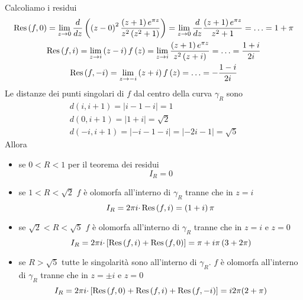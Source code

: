 \begin{figure}[htpb]
\end{figure}
\FloatBarrier

Calcoliamo i residui
\begin{gather*}
\operatorname{Res} \left( f,0\right) =\lim _{z\rightarrow 0}\frac{d}{dz}\left(\left( z-0\right)^{2}\frac{\left( z+1\right) e^{\pi z}}{z^{2}\left( z^{2} +1\right)}\right) =\lim _{z\rightarrow 0}\frac{d}{dz}\frac{\left( z+1\right) e^{\pi z}}{z^{2} +1} =\dotsc =1+\pi \\
\operatorname{Res} \left( f,i\right) =\lim _{z\rightarrow i}\left( z-i\right) f\left( z\right) =\lim _{z\rightarrow i}\frac{\left( z+1\right) e^{\pi z}}{z^{2}\left( z+i\right)} =\dotsc =\frac{1+i}{2i}\\
\operatorname{Res} \left( f,-i\right) =\lim _{z\rightarrow -i}\left( z+i\right) f\left( z\right) =\dotsc =-\frac{1-i}{2i}
\end{gather*}
Le distanze dei punti singolari di $f$ dal centro della curva $\gamma _{R}$ sono
\begin{gather*}
d\left( i,i+1\right) =\left| i-1-i\right| =1\\
d\left( 0,i+1\right) =\left| 1+i\right| =\sqrt{2}\\
d\left( -i,i+1\right) =\left| -i-1-i\right| =\left| -2i-1\right| =\sqrt{5}
\end{gather*}
Allora
\begin{itemize}
\item se $0< R< 1$ per il teorema dei residui\begin{equation*}
I_{R} =0
\end{equation*}
\item se $1< R< \sqrt{2}$ $f$ è olomorfa all'interno di $\gamma _{R}$ tranne che in $z=i$\begin{equation*}
I_{R} =2\pi i\cdotp \operatorname{Res} \left( f,i\right) =\left( 1+i\right) \pi 
\end{equation*}
\item se $\sqrt{2} < R< \sqrt{5}$ $f$ è olomorfa all'interno di $\gamma _{R}$ tranne che in $z=i$ e $z=0$\begin{equation*}
I_{R} =2\pi i\cdotp \left[\operatorname{Res} \left( f,i\right) +\operatorname{Res} \left( f,0\right)\right] =\pi +i\pi \left( 3 +2\pi\right)
\end{equation*}
\item se $R> \sqrt{5}$ tutte le singolarità sono all'interno di $\gamma _{R}$. $f$ è olomorfa all'interno di $\gamma _{R}$ tranne che in $z=\pm i$ e $z=0$\begin{equation*}
I_{R} =2\pi i\cdotp \left[\operatorname{Res} \left( f,0\right) +\operatorname{Res} \left( f,i\right) +\operatorname{Res} \left( f,-i\right)\right] = i2\pi (2+\pi )
\end{equation*}
\end{itemize}

